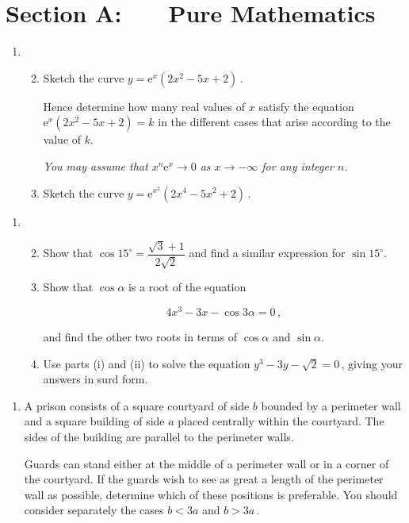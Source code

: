 \documentclass[a4, 11pt]{report}
\newlength{\qspace}
\newcounter{qnumber}
\newenvironment{question}%
 {\vspace{\qspace}
  \begin{enumerate}[\bfseries 1\quad][10]%
    \setcounter{enumi}{\value{qnumber}}%
    \item%
 }
{
  \end{enumerate}
  \filbreak
  \stepcounter{qnumber}
 }
\newenvironment{questionparts}[1][1]%
 {
  \begin{enumerate}[\bfseries (i)]%
    \setcounter{enumii}{#1}
    \addtocounter{enumii}{-1}
    \setlength{\itemsep}{5mm}
    \setlength{\parskip}{8pt}
 }
 {
  \end{enumerate}
 }
\def\e{{\mathrm e}}
\renewcommand{\.}[1]{\ensuremath{\mathrm{#1}}}
\newcommand{\+}[1]{\ensuremath{\mathbf{#1}}}
\begin{document}
\setcounter{page}{2}

 
\section*{Section A: \ \ \ Pure Mathematics}


\begin{question}
\begin{questionparts}

\item  Sketch the curve $y = \e^x (2x^2 -5x+ 2)\,.$ 

Hence determine how many real values of $x$ satisfy the equation $\e^x (2x^2 -5x+ 2)= k$ in the different cases that arise according to the value of $k$.

{\em You may assume that $x^n \e^x\to 0$ as $x\to-\infty$ for any integer $n$.} 

\item Sketch  the curve  $\displaystyle y = \e^{x^2}  (2x^4 -5x^2+ 2)\,$.

\end{questionparts}

\end{question}
\begin{question}
\begin{questionparts}
\item Show that $\cos 15^\circ = \dfrac{\sqrt3 +1}{2\sqrt2}$ and find a similar expression for $\sin 15^\circ$.

\item

Show that $\cos \alpha$ is a root of the equation 

\[
4x^3-3 x -\cos 3\alpha =0\,,
\]

and find the other two roots in terms of $\cos\alpha$ and $\sin\alpha$.
\item Use parts (i) and (ii) to solve the equation $y^3-3y -\sqrt2 =0\,$, giving your answers in surd form. 

\end{questionparts}
\end{question}

\begin{question}
A prison consists of a square courtyard of side $b$  bounded by a perimeter wall and a square building  of side $a$ placed centrally within the courtyard. The sides of the building are parallel to the perimeter walls.

Guards can stand either at the middle of a perimeter wall or in a corner of the courtyard. If the guards wish to see as great a length of the perimeter wall as possible, determine which of these positions is preferable.  You should consider separately  the cases $b<3a$   and  $b>3a\,$.
\end{question}
\end{document}
